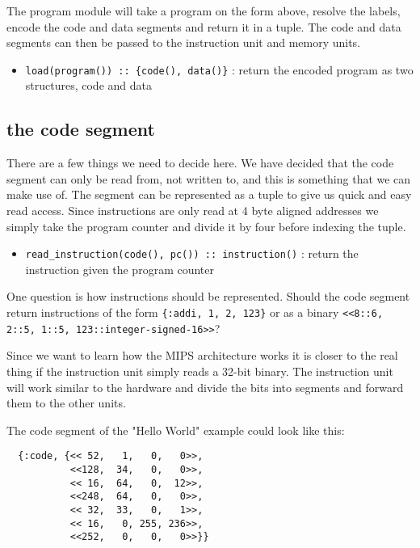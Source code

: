 \documentclass[a4paper,11pt]{article}
\begin{document}
The program module will take a program on the form above, resolve the
labels, encode the code and data segments and return it in a
tuple. The code and data segments can then be passed to the instruction
unit and memory units.

\begin{itemize}
\item {\tt load(program()) :: \{code(), data()\}} : return the encoded program as two structures, code and data
\end{itemize}

\subsection{the code segment}

There are a few things we need to decide here. We have decided that
the code segment can only be read from, not written to, and this is
something that we can make use of. The segment can be represented as a
tuple to give us quick and easy read access. Since instructions are
only read at 4 byte aligned addresses we simply take the program
counter and divide it by four before indexing the tuple.

\begin{itemize}
\item {\tt read\_instruction(code(), pc()) :: instruction()} : return the  instruction given the program counter
\end{itemize}

One question is how instructions should be represented. Should the
code segment return instructions of the form {\tt \{:addi, 1, 2,
  123\}} or as a binary {\tt <<8::6, 2::5, 1::5,
  123::integer-signed-16>>}? 

Since we want to learn how the MIPS architecture works it is closer to
the real thing if the instruction unit simply reads a 32-bit
binary. The instruction unit will work similar to the hardware and
divide the bits into segments and forward them to the other units.

The code segment of the "Hello World" example could look like this:

\begin{verbatim}
  {:code, {<< 52,   1,   0,   0>>,
           <<128,  34,   0,   0>>,
           << 16,  64,   0,  12>>, 
           <<248,  64,   0,   0>>,
           << 32,  33,   0,   1>>, 
           << 16,   0, 255, 236>>, 
           <<252,   0,   0,   0>>}}
\end{verbatim}
\end{document}

